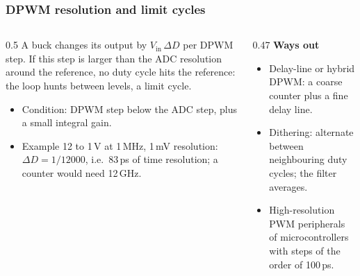 \begin{frame}
	\frametitle{DPWM resolution and limit cycles}
	\begin{columns}[T]
		\begin{column}{0.5\textwidth}
			\small
			A buck changes its output by $V_\mathrm{in}\,\Delta D$ per DPWM step. If this step is larger than the ADC resolution around the reference, no duty cycle hits the reference: the loop hunts between levels, a limit cycle.
			\begin{itemize}
				\item Condition: DPWM step below the ADC step, plus a small integral gain.
				\item Example 12 to 1\,V at 1\,MHz, 1\,mV resolution: $\Delta D=1/12000$, i.e.\ 83\,ps of time resolution; a counter would need 12\,GHz.
			\end{itemize}
		\end{column}
		\begin{column}{0.47\textwidth}
			\small
			\textbf{Ways out}
			\begin{itemize}
				\item Delay-line or hybrid DPWM: a coarse counter plus a fine delay line.
				\item Dithering: alternate between neighbouring duty cycles; the filter averages.
				\item High-resolution PWM peripherals of microcontrollers with steps of the order of 100\,ps.
			\end{itemize}
		\end{column}
	\end{columns}
\end{frame}

